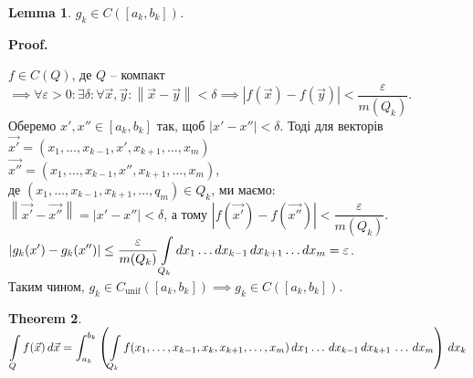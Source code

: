 \documentclass[a4paper, 10pt]{article}
\makeatletter
\def\qed{$\blacksquare$}
\theoremstyle{theoremdd}
\newtheorem{theorem}{Theorem}[subsection]
\theoremstyle{theoremdd}
\theoremstyle{theoremdd}
\theoremstyle{theoremdd}
\theoremstyle{theoremdd}
\theoremstyle{theoremdd}
\theoremstyle{theoremdd}
\theoremstyle{theoremdd}
\theoremstyle{theoremdd}
\theoremstyle{theoremdd}
\theoremstyle{theoremdd}
\theoremstyle{theoremdd}
\theoremstyle{theoremdd}
\newtheorem{lemma}[theorem]{Lemma}
\theoremstyle{theoremdd}
\theoremstyle{theoremdd}
\renewenvironment{proof}[1][Proof.\\]{\par
\pushQED{\hfill \qed}%
\normalfont \topsep6\p@\@plus6\p@\relax
\trivlist
\item\relax
{\bfseries
#1\@addpunct{.}}\hspace\labelsep\ignorespaces
}{%
\popQED\endtrivlist\@endpefalse
}
\newcommand\Norm[1]{\left\lVert#1\right\rVert}
\makeatother
\begin{document}
\begin{lemma}
$g_k \in C([a_k,b_k])$.
\end{lemma}

\begin{proof}
$f \in C(Q)$, де $Q$ -- компакт $\implies \forall \varepsilon > 0: \exists \delta: \forall \vec{x}, \vec{y}: \Norm{\vec{x} - \vec{y}} < \delta \implies |f(\vec{x}) - f(\vec{y})| < \dfrac{\varepsilon}{m(Q_k)}$.\\
Оберемо $x',x'' \in [a_k,b_k]$ так, щоб $|x'-x''|<\delta$. Тоді для векторів\\
$\vec{x'} = (x_1,\dots,x_{k-1},x',x_{k+1},\dots,x_m)$\\
$\vec{x''} = (x_1,\dots,x_{k-1},x'',x_{k+1},\dots,x_m)$,\\
де $(x_1,\dots,x_{k-1},x_{k+1},\dots,q_m) \in Q_k$, ми маємо:\\
$\Norm{\vec{x'} - \vec{x''}} = |x'-x''| < \delta$, а тому $|f(\vec{x'}) - f(\vec{x''})| < \dfrac{\varepsilon}{m(Q_k)}$.\\
$\displaystyle |g_k(x') - g_k(x'')| \leq \dfrac{\varepsilon}{m(Q_k)} \int\displaylimits_{Q_k} dx_1\dots dx_{k-1}\,dx_{k+1}\dots dx_m = \varepsilon$.\\
Таким чином, $g_k \in C_{\text{unif}}([a_k,b_k]) \implies g_k \in C([a_k,b_k])$.
\end{proof}

\begin{theorem}
$\displaystyle\int\displaylimits_Q f(\vec{x})\,d\vec{x} = \int_{a_k}^{b_k} \left( \int\displaylimits_{Q_k} f(x_1,\dots,x_{k-1},x_k,x_{k+1},\dots,x_m)\,dx_1\dots \,dx_{k-1}\,dx_{k+1}\,\dots\,dx_m \right)\,dx_k$
\end{theorem}

\iffalse
\begin{proof}
Я запишу доведення для випадку функції трьох змінних. Тобто буду доводити, що \\ $\displaystyle\int_Q f(x,y,z)\,dx\,dy\,dz = \int_{a_3}^{b_3} \left(\int\displaylimits_{Q_3} f(x,y,z)\,dx\,dy\right)\,dz$.\\
На вищу розмірність доведення повторюється.
\bigskip \\
$f \in \mathcal{R}(Q)$, тому що вимагали функцію $f \in C(Q)$. Тому $\forall \varepsilon > 0: \exists \lambda: U(f,\lambda) - L(f,\lambda) < \varepsilon$.\\
Розбиття $\lambda$ природним чином розбиває також брус $Q_3$. Маємо:\\
$\displaystyle\int_{a_3}^{b_3} g_3(t)\,dt = \displaystyle\sum_{v_3=1}^{n_3} \int_{z(v_3-1)}^{z(v_3)} g_3(t)\,dt \leq \sum_{v_3=1}^{n_3} \sup_{t \in [z(v_3-1),z(v_3)]} g_3(t) \Delta z(v_3)$
\end{proof}
\fi
\end{document}
